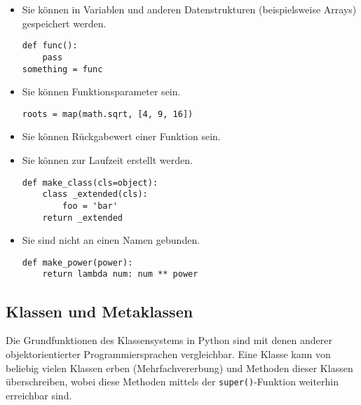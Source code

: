 \begin{itemize}
\item Sie können in Variablen und anderen Datenstrukturen (beispielsweise Arrays) gespeichert werden.
\begin{lstlisting}[caption=Zuweisung einer Funktion an eine Variable]
def func():
    pass
something = func
\end{lstlisting}

\item Sie können Funktionsparameter sein.
\begin{lstlisting}[caption=Erstellen einer neuen Liste mittels einer Transformationsfunktion]
roots = map(math.sqrt, [4, 9, 16])
\end{lstlisting}

\item Sie können Rückgabewert einer Funktion sein.

\item Sie können zur Laufzeit erstellt werden.
\begin{lstlisting}[caption=Eine Funktion\, die eine neue Klasse erstellt und zurückgibt]
def make_class(cls=object):
    class _extended(cls):
        foo = 'bar'
    return _extended
\end{lstlisting}

\item Sie sind nicht an einen Namen gebunden.
\begin{lstlisting}[caption=Erstellen einer anonymen Funktion]
def make_power(power):
    return lambda num: num ** power
\end{lstlisting}
\end{itemize}



\subsection{Klassen und Metaklassen}
Die Grundfunktionen des Klassensystems in Python sind mit denen anderer objektorientierter
Programmiersprachen vergleichbar. Eine Klasse kann von beliebig vielen Klassen erben
(Mehrfachvererbung) und Methoden dieser Klassen überschreiben, wobei diese Methoden mittels der
\lstinline{super()}-Funktion weiterhin erreichbar sind.

